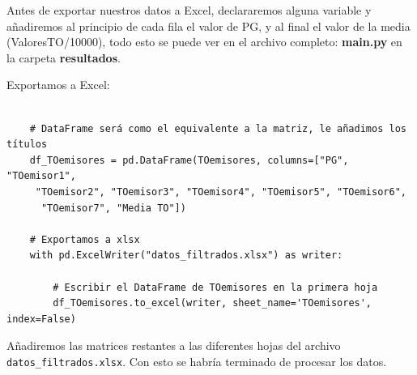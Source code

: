 \documentclass{article}
\begin{document}
\quad

Antes de exportar nuestros datos a Excel, declararemos alguna variable y añadiremos al principio de cada fila el valor de PG, y al final el valor de la media (ValoresTO/10000), todo esto se puede ver en el archivo completo: \textbf{main.py} en la carpeta \textbf{resultados}.

Exportamos a Excel:

\begin{center} 
    \begin{verbatim}

    # DataFrame será como el equivalente a la matriz, le añadimos los títulos 
    df_TOemisores = pd.DataFrame(TOemisores, columns=["PG", "TOemisor1",
     "TOemisor2", "TOemisor3", "TOemisor4", "TOemisor5", "TOemisor6",
      "TOemisor7", "Media TO"])

    # Exportamos a xlsx
    with pd.ExcelWriter("datos_filtrados.xlsx") as writer:

        # Escribir el DataFrame de TOemisores en la primera hoja
        df_TOemisores.to_excel(writer, sheet_name='TOemisores', index=False)

    \end{verbatim}
    \end{center} 
\quad

Añadiremos las matrices restantes a las diferentes hojas del archivo \verb|datos_filtrados.xlsx|. Con esto se habría terminado de procesar los datos.
\end{document}
